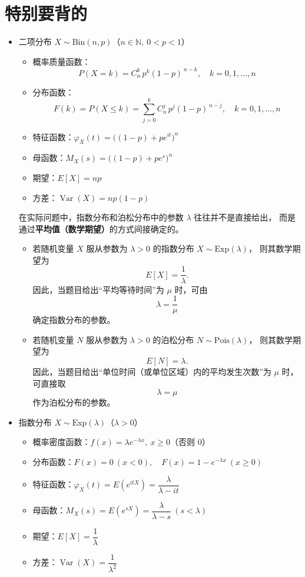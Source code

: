 \chapter{特别要背的}
\begin{itemize}

 \item 二项分布 $X\sim \mathrm{Bin}(n,p)$（$n\in\mathbb N,\ 0<p<1$）
\begin{itemize}
  \item 概率质量函数：
  \[
  P(X=k)=C_n^k\,p^k(1-p)^{\,n-k},\quad k=0,1,\dots,n
  \]
  \item 分布函数：
  \[
  F(k)=P(X\le k)=\sum_{j=0}^{k} C_n^j\,p^j(1-p)^{\,n-j},\quad k=0,1,\dots,n
  \]
  \item 特征函数：$\varphi_X(t)=\big((1-p)+pe^{it}\big)^n$
  \item 母函数：$M_X(s)=\big((1-p)+pe^{s}\big)^n$
  \item 期望：$E[X]=np$
  \item 方差：$\operatorname{Var}(X)=np(1-p)$
\end{itemize}
\begin{dxtips}
   在实际问题中，指数分布和泊松分布中的参数 $\lambda$ 往往并不是直接给出，
而是通过\textbf{平均值（数学期望）}的方式间接确定的。

\begin{itemize}
  \item 若随机变量 $X$ 服从参数为 $\lambda>0$ 的指数分布 $X\sim \mathrm{Exp}(\lambda)$，
  则其数学期望为
  \[
  E[X]=\frac{1}{\lambda}.
  \]
  因此，当题目给出“平均等待时间”为 $\mu$ 时，可由
  \[
  \lambda=\frac{1}{\mu}
  \]
  确定指数分布的参数。

  \item 若随机变量 $N$ 服从参数为 $\lambda>0$ 的泊松分布 $N\sim \mathrm{Pois}(\lambda)$，
  则其数学期望为
  \[
  E[N]=\lambda.
  \]
  因此，当题目给出“单位时间（或单位区域）内的平均发生次数”为 $\mu$ 时，
  可直接取
  \[
  \lambda=\mu
  \]
  作为泊松分布的参数。
\end{itemize}
\end{dxtips}
  \item 指数分布 $X\sim \mathrm{Exp}(\lambda)$（$\lambda>0$）
  \begin{itemize}
    \item 概率密度函数：$f(x)=\lambda e^{-\lambda x},\ x\ge 0$（否则 $0$）
    \item 分布函数：$F(x)=0\ (x<0),\quad F(x)=1-e^{-\lambda x}\ (x\ge 0)$
    \item 特征函数：$\varphi_X(t)=E(e^{itX})=\dfrac{\lambda}{\lambda-it}$
    \item 母函数：$M_X(s)=E(e^{sX})=\dfrac{\lambda}{\lambda-s}\ (s<\lambda)$
    \item 期望：$E[X]=\dfrac{1}{\lambda}$
    \item 方差：$\operatorname{Var}(X)=\dfrac{1}{\lambda^2}$
  \end{itemize}


\end{itemize}

